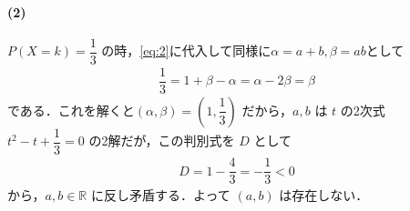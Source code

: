 \documentclass[../../main.tex]{subfiles}
\begin{document}
\paragraph{(2)}

$P(X=k) = \dfrac{1}{3}$ の時，\cref{eq:2}に代入して同様に$\alpha=a+b,\beta=ab$として
\begin{align}
  \dfrac{1}{3} = 1 + \beta - \alpha = \alpha - 2\beta = \beta
\end{align}
である．これを解くと$(\alpha, \beta) = \left(1, \dfrac{1}{3}\right)$ だから，$a, b$ は $t$ の2次式 $t^2 - t + \dfrac{1}{3} = 0$ の2解だが，この判別式を $D$ として
\begin{align}
  D = 1 - \dfrac{4}{3} = -\dfrac{1}{3} < 0
\end{align}
から，$a, b \in \mathbb{R}$ に反し矛盾する．よって $(a, b)$ は存在しない．
\end{document}

